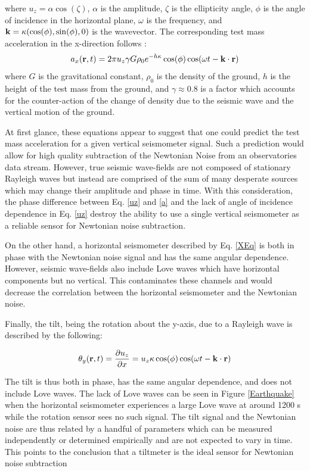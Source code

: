 \documentclass [12pt, proquest]{uwthesis}[2019]
\begin{document}
where $u_z=\alpha \cos(\zeta)$, $\alpha$ is the amplitude, $\zeta$ is the ellipticity angle, $\phi$ is the angle of incidence in the horizontal plane, $\omega$ is the frequency, and $\bf{k}=\kappa (\cos(\phi),\sin(\phi),\text{0})$ is the wavevector. The corresponding test mass acceleration in the x-direction follows \cite{Harms_2016}:
\begin{equation}
a_x({\bf r} ,t)=2 \pi u_z \gamma G \rho_0 e^{-h \kappa}  \cos(\phi) \cos(\omega t-{\bf k}\cdot{\bf r}) \label{a}
\end{equation}
where $G$ is the gravitational constant, $\rho_0$ is the density of the ground, $h$ is the height of the test mass from the ground, and $\gamma \approx 0.8$ is a factor which accounts for the counter-action of the change of density due to the seismic wave and the vertical motion of the ground.

At first glance, these equations appear to suggest that one could predict the test mass acceleration for a given vertical seismometer signal. Such a prediction would allow for high quality subtraction of the Newtonian Noise from an observatories data stream. However, true seismic wave-fields are not composed of stationary Rayleigh waves but instead are comprised of the sum of many desperate sources which may change their amplitude and phase in time. With this consideration, the phase difference between Eq. \ref{uz} and \ref{a} and the lack of angle of incidence dependence in Eq. \ref{uz} destroy the ability to use a single vertical seismometer as a reliable sensor for Newtonian noise subtraction.

On the other hand, a horizontal seismometer described by Eq. \ref{XEq} is both in phase with the Newtonian noise signal and has the same angular dependence. However, seismic wave-fields also include Love waves which have horizontal components but no vertical. This contaminates these channels and would decrease the correlation between the horizontal seismometer and the Newtonian noise. 

Finally, the tilt, being the rotation about the y-axis, due to a Rayleigh wave is described by the following:

\begin{equation}
\theta_y({\bf r} ,t)=\frac{\partial u_z}{\partial x}=u_z \kappa \cos(\phi) \cos(\omega t-{\bf k}\cdot{\bf r})\label{tX}\\
\end{equation}

The tilt is thus both in phase, has the same angular dependence, and does not include Love waves. The lack of Love waves can be seen in Figure \ref{Earthquake} when the horizontal seismometer experiences a large Love wave at around 1200 s while the rotation sensor sees no such signal. The tilt signal and the Newtonian noise are thus related by a handful of parameters which can be measured independently or determined empirically and are not expected to vary in time. This points to the conclusion that a tiltmeter is the ideal sensor for Newtonian noise subtraction
\end{document}
